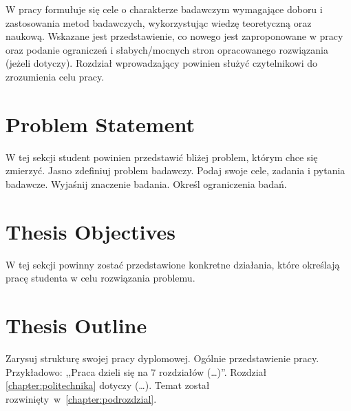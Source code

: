 \label{chapter:introduction}
W pracy formułuje się cele o charakterze badawczym wymagające doboru i zastosowania metod badawczych, wykorzystując wiedzę teoretyczną oraz naukową. Wskazane jest przedstawienie, co nowego jest zaproponowane w pracy oraz podanie ograniczeń i słabych/mocnych stron opracowanego rozwiązania (jeżeli dotyczy). Rozdział wprowadzający powinien służyć czytelnikowi do zrozumienia celu pracy.

\section{Problem Statement}
W tej sekcji student powinien przedstawić bliżej problem, którym chce się zmierzyć. Jasno zdefiniuj problem badawczy. Podaj swoje cele, zadania i pytania badawcze. Wyjaśnij znaczenie badania. Określ ograniczenia badań.


\section{Thesis Objectives}
W tej sekcji powinny zostać przedstawione konkretne działania, które określają pracę studenta w celu rozwiązania problemu.


\section{Thesis Outline}
Zarysuj strukturę swojej pracy dyplomowej. Ogólnie przedstawienie pracy. Przykładowo: ,,Praca dzieli się na $7$ rozdziałów (\dots)''. Rozdział \ref{chapter:politechnika} dotyczy (\dots). Temat został rozwinięty~w~\ref{chapter:podrozdzial}.
